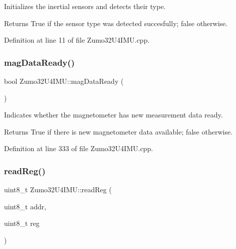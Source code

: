 Initializes the inertial sensors and detects their type. 

\begin{DoxyReturn}{Returns}
True if the sensor type was detected succesfully; false otherwise. 
\end{DoxyReturn}


Definition at line 11 of file Zumo32\+U4\+I\+M\+U.\+cpp.

\mbox{\label{class_zumo32_u4_i_m_u_ad9a7bde2fa435b4ceb6929e73acef4b6}} 
\subsubsection{\texorpdfstring{mag\+Data\+Ready()}{magDataReady()}}
{\footnotesize\ttfamily bool Zumo32\+U4\+I\+M\+U\+::mag\+Data\+Ready (\begin{DoxyParamCaption}{ }\end{DoxyParamCaption})}



Indicates whether the magnetometer has new measurement data ready. 

\begin{DoxyReturn}{Returns}
True if there is new magnetometer data available; false otherwise. 
\end{DoxyReturn}


Definition at line 333 of file Zumo32\+U4\+I\+M\+U.\+cpp.

\mbox{\label{class_zumo32_u4_i_m_u_a8bc90dccbd0259a97a5f0bd1e8f0316a}} 
\subsubsection{\texorpdfstring{read\+Reg()}{readReg()}}
{\footnotesize\ttfamily uint8\+\_\+t Zumo32\+U4\+I\+M\+U\+::read\+Reg (\begin{DoxyParamCaption}\item[{uint8\+\_\+t}]{addr,  }\item[{uint8\+\_\+t}]{reg }\end{DoxyParamCaption})}



